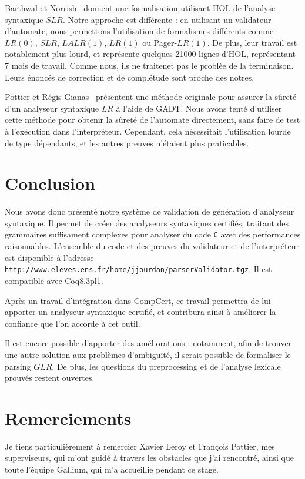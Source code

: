 \documentclass[a4paper,11pt]{article}
\begin{document}
Barthwal et Norrish~\cite{barthwal} donnent une formalisation
utilisant HOL de l'analyse syntaxique $SLR$. Notre approche est
différente : en utilisant un validateur d'automate, nous permettons
l'utilisation de formalismes différents comme $LR(0)$, $SLR$,
$LALR(1)$, $LR(1)$ ou Pager-$LR(1)$. De plus, leur travail est
notablement plus lourd, et représente quelques 21000 lignes d'HOL,
représentant 7 mois de travail. Comme nous, ils ne traitenet pas le
problèe de la terminaison. Leurs énoncés de correction et de
complétude sont proche des notres.

Pottier et Régis-Gianas~\cite{gadtparsing} présentent une méthode
originale pour assurer la sûreté d'un analyseur syntaxique $LR$ à
l'aide de GADT. Nous avons tenté d'utiliser cette méthode pour obtenir
la sûreté de l'automate directement, sans faire de test à l'exécution
dans l'interpréteur. Cependant, cela nécessitait l'utilisation lourde
de type dépendants, et les autres preuves n'étaient plus praticables.

\section*{Conclusion}

Nous avons donc présenté notre système de validation de génération
d'analyseur syntaxique. Il permet de créer des analyseurs syntaxiques
certifiés, traitant des grammaires suffisament complexes pour analyser
du code \texttt{C} avec des performances raisonnables. L'ensemble du
code et des preuves du validateur et de l'interpréteur est disponible
à l'adresse
\verb+http://www.eleves.ens.fr/home/jjourdan/parserValidator.tgz+. Il
est compatible avec Coq8.3pl1. 

Après un travail d'intégration dans CompCert, ce travail permettra
de lui apporter un analyseur syntaxique certifié, et contribura ainsi
à améliorer la confiance que l'on accorde à cet outil.

Il est encore possible d'apporter des améliorations : notamment, afin
de trouver une autre solution aux problèmes d'ambiguïté, il serait
possible de formaliser le parsing $GLR$. De plus, les questions du
preprocessing et de l'analyse lexicale prouvés restent ouvertes.

\section*{Remerciements}

Je tiens particulièrement à remercier Xavier Leroy et François
Pottier, mes superviseurs, qui m'ont guidé à travers les obstacles que
j'ai rencontré, ainsi que toute l'équipe Gallium, qui m'a accueillie
pendant ce stage.
\end{document}
